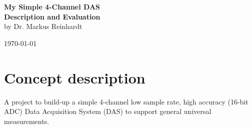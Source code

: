\documentclass[11pt, oneside]{scrartcl}   	%
\begin{document}
\begingroup
	\thispagestyle{empty}
	\centering
	\par\normalfont\fontsize{30}{30}\sffamily\selectfont
	\vspace*{1.0cm}
	{\color{blue}
		\textbf{\Huge My Simple 4-Channel DAS} \\ 
		\textbf{\huge Description and Evaluation} \\
		\vspace*{0.5cm}
		\hspace{-0.3cm}
		{\textbf\huge by Dr. Markus Reinhardt }\par %
		\hspace{-1.3cm}
		{\textbf \huge  \today}\par %
		\vspace*{1.5cm}
	}
\endgroup
\vfill

\newpage
\thispagestyle{empty}
\tableofcontents
\newpage

\newpage
\thispagestyle{empty}
\listoffigures
\listoftables

\newpage
\pagestyle{scrheadings}
\section{Concept description}
A project to build-up a simple 4-channel low sample rate, high accuracy (16-bit ADC)
Data Acquisition System (DAS) to support general universal measurements.\\
\end{document}
